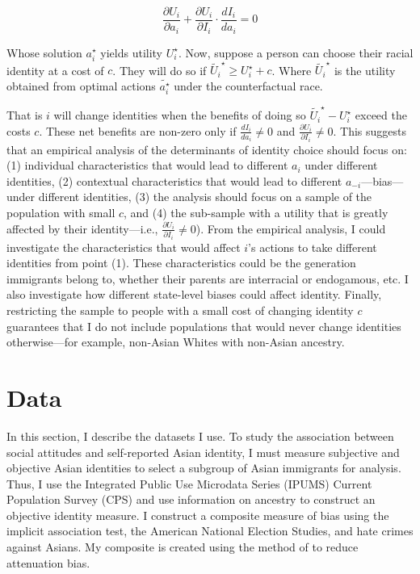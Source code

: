 \begin{equation}
\frac{\partial U_i}{\partial a_i} + \frac{\partial U_i}{\partial I_i} \cdot \frac{d I_i}{d a_i} = 0\label{eq:foc}
\end{equation}

Whose solution $a_{i}^{\star}$ yields utility $U_{i}^{\star}$. Now, suppose a person can choose their racial identity at a cost of $c$. They will do so if $\tilde{U_{i}}^{\star} \geq  U_{i}^{\star} + c$. Where $\tilde{U_{i}}^{\star}$ is the utility obtained from optimal actions $\tilde{a_i^{\star}}$ under the counterfactual race. 

That is $i$ will change identities when the benefits of doing so $\tilde{U_{i}}^{\star} - U_{i}^{\star}$ exceed the costs $c$. These net benefits are non-zero only if $\frac{d I_i}{d a_i} \neq 0$ and $\frac{\partial U_i}{\partial I_i} \neq 0$. This suggests that an empirical analysis of the determinants of identity choice should focus on: (1) individual characteristics that would lead to different $a_i$ under different identities, (2) contextual characteristics that would lead to different $a_{-i}$---bias---under different identities, (3) the analysis should focus on a sample of the population with small $c$, and (4) the sub-sample with a utility that is greatly affected by their identity---i.e., $\frac{\partial U_i}{\partial I_i} \neq 0$). From the empirical analysis, I could investigate the characteristics that would affect $i$'s actions to take different identities from point (1). These characteristics could be the generation immigrants belong to, whether their parents are interracial or endogamous, etc. I also investigate how different state-level biases could affect identity. Finally, restricting the sample to people with a small cost of changing identity $c$ guarantees that I do not include populations that would never change identities otherwise---for example, non-Asian Whites with non-Asian ancestry.

\section{Data}\label{sec:data}

In this section, I describe the datasets I use. To study the association between social attitudes and self-reported Asian identity, I must measure subjective and objective Asian identities to select a subgroup of Asian immigrants for analysis. Thus, I use the Integrated Public Use Microdata Series (IPUMS) Current Population Survey (CPS) \autocite{floodsarahIntegratedPublicUse2021a} and use information on ancestry to construct an objective identity measure. I construct a composite measure of bias using the implicit association test, the American National Election Studies, and hate crimes against Asians. My composite is created using the method of \textcite{lubotskyInterpretationRegressionsMultiple2006} to reduce attenuation bias. 


